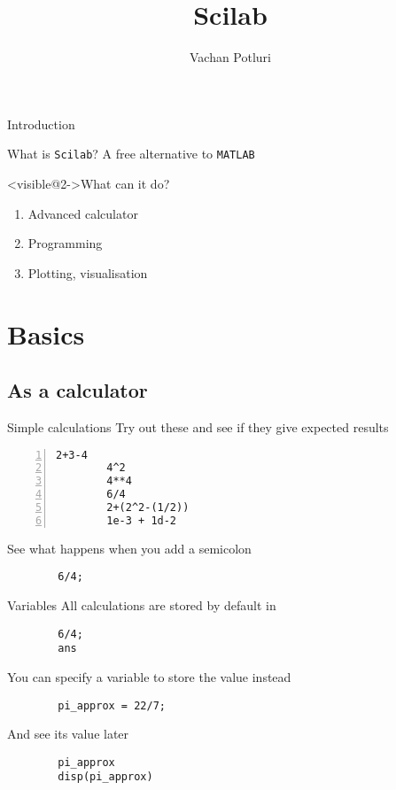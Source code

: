 \documentclass[%
    10pt,
    xcolor={dvipsnames},
    compress, %
]{beamer}
\title{Scilab}
\author[Vachan Potluri]{%
    Vachan Potluri\\
    \email{vachanpotluri@iitb.ac.in}
}
\newcommand{\matlab}{\texttt{MATLAB}}
\newcommand{\scilab}{\texttt{Scilab}}
\begin{document}
\setlength\leftmargini{1em} %
\setlength\leftmarginii{\leftmargini} %
\setlength\leftmarginiii{\leftmarginii} %

{
    \begin{frame}
        \titlepage
    \end{frame}
}

\begin{frame}{Introduction}
    \begin{block}{What is \scilab?}
        A free alternative to \matlab
    \end{block}
    \begin{block}<visible@2->{What can it do?}
        \begin{enumerate}
            \item Advanced calculator
            \item Programming
            \item Plotting, visualisation
        \end{enumerate}
    \end{block}
\end{frame}

\section{Basics}
\subsection{As a calculator}
\begin{frame}[fragile]{Simple calculations}
    Try out these and see if they give expected results
    \begin{lstlisting}[numbers=left]
        2+3-4
        4^2
        4**4
        6/4
        2+(2^2-(1/2))
        1e-3 + 1d-2
    \end{lstlisting}
    See what happens when you add a semicolon
    \begin{lstlisting}
        6/4;
    \end{lstlisting}
\end{frame}

\begin{frame}[fragile]{Variables}
    All calculations are stored by default in 
    \begin{lstlisting}
        6/4;
        ans
    \end{lstlisting}
    You can specify a variable to store the value instead
    \begin{lstlisting}
        pi_approx = 22/7;
    \end{lstlisting}
    And see its value later
    \begin{lstlisting}
        pi_approx
        disp(pi_approx)
    \end{lstlisting}
\end{frame}
\end{document}
